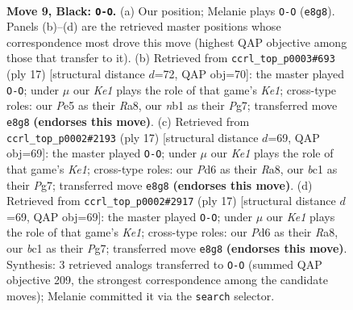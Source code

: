 \documentclass[11pt]{article}
\begin{document}
\begin{figure}[p]\centering
\begin{subfigure}{0.46\textwidth}\centering
\resizebox{\linewidth}{!}{%
\newchessgame
\chessboard[
  setfen={r2qk2r/2pbbppp/p1np1n2/1p2p1N1/P3P3/1B6/1PPP1PPP/RNBQR1K1 b kq - 2 9},
  showmover=false,
  pgfstyle=straightmove, color=movearrow, markmove={e8-g8}
]}
\caption{}
\end{subfigure}\hfill
\begin{subfigure}{0.46\textwidth}\centering
\resizebox{\linewidth}{!}{%
\newchessgame
\chessboard[
  setfen={r2qk2r/2pbbppp/p1np1n2/1p2p3/P3P3/1BP2N2/1P1P1PPP/RNBQR1K1 b kq - 0 9},
  showmover=false,
  pgfstyle=straightmove, color=movearrow, markmove={e8-g8}
]}
\caption{}
\end{subfigure}
\\[4pt]
\begin{subfigure}{0.46\textwidth}\centering
\resizebox{\linewidth}{!}{%
\newchessgame
\chessboard[
  setfen={r2qk2r/2pbbppp/p1np1n2/1p2p3/P3P3/1BPP1N2/1P3PPP/RNBQ1RK1 b kq - 0 9},
  showmover=false,
  pgfstyle=straightmove, color=movearrow, markmove={e8-g8}
]}
\caption{}
\end{subfigure}\hfill
\begin{subfigure}{0.46\textwidth}\centering
\resizebox{\linewidth}{!}{%
\newchessgame
\chessboard[
  setfen={r2qk2r/2pbbppp/p1np1n2/1p2p3/P3P3/1BPP1N2/1P3PPP/RNBQ1RK1 b kq - 0 9},
  showmover=false,
  pgfstyle=straightmove, color=movearrow, markmove={e8-g8}
]}
\caption{}
\end{subfigure}
\caption{\textbf{Move 9, Black: \texttt{O-O}.} (a) Our position; Melanie plays \texttt{O-O} (\texttt{e8g8}). Panels (b)--(d) are the retrieved master positions whose correspondence most drove this move (highest QAP objective among those that transfer to it). (b) Retrieved from \texttt{ccrl\_top\_p0003\#693} (ply 17) [structural distance $d$=72, QAP obj=70]: the master played \texttt{O-O}; under $\mu$ our \emph{Ke1} plays the role of that game's \emph{Ke1}; cross-type roles: our \emph{P}e5 as their \emph{R}a8, our \emph{n}b1 as their \emph{P}g7; transferred move \texttt{e8g8} \textbf{(endorses this move)}. (c) Retrieved from \texttt{ccrl\_top\_p0002\#2193} (ply 17) [structural distance $d$=69, QAP obj=69]: the master played \texttt{O-O}; under $\mu$ our \emph{Ke1} plays the role of that game's \emph{Ke1}; cross-type roles: our \emph{P}d6 as their \emph{R}a8, our \emph{b}c1 as their \emph{P}g7; transferred move \texttt{e8g8} \textbf{(endorses this move)}. (d) Retrieved from \texttt{ccrl\_top\_p0002\#2917} (ply 17) [structural distance $d$=69, QAP obj=69]: the master played \texttt{O-O}; under $\mu$ our \emph{Ke1} plays the role of that game's \emph{Ke1}; cross-type roles: our \emph{P}d6 as their \emph{R}a8, our \emph{b}c1 as their \emph{P}g7; transferred move \texttt{e8g8} \textbf{(endorses this move)}. Synthesis: 3 retrieved analogs transferred to \texttt{O-O} (summed QAP objective 209, the strongest correspondence among the candidate moves); Melanie committed it via the \texttt{search} selector.}
\label{fig:thought-m17}
\end{figure}
\end{document}
